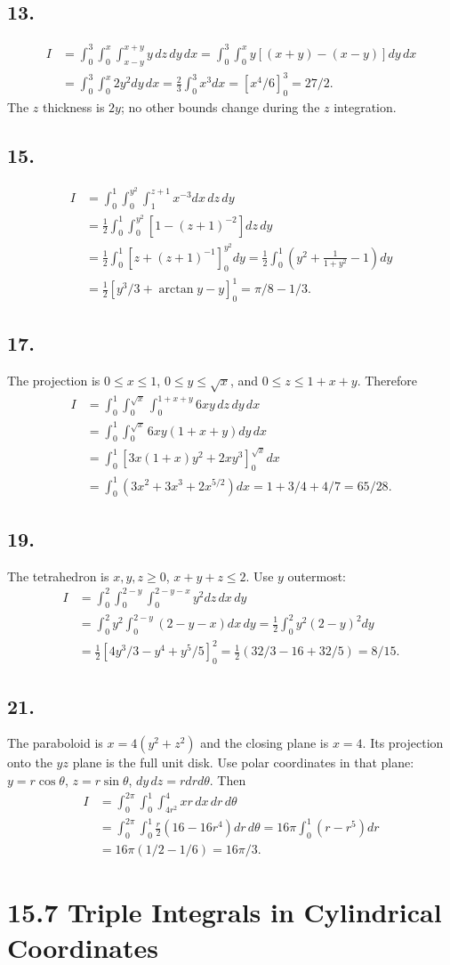 \documentclass[11pt]{article}
\newcommand{\ex}[1]{\subsection*{#1.}}
\newcommand{\ans}[1]{\boxed{#1}}
\begin{document}
\ex{13}
\begin{align*}
I&=\int_0^3\int_0^x\int_{x-y}^{x+y}y\,dz\,dy\,dx
=\int_0^3\int_0^x y[(x+y)-(x-y)]dy\,dx\\
&=\int_0^3\int_0^x2y^2dy\,dx
=\frac23\int_0^3x^3dx=[x^4/6]_0^3=\ans{27/2}.
\end{align*}
The $z$ thickness is $2y$; no other bounds change during the $z$ integration.
\ex{15}
\begin{align*}
I&=\int_0^1\int_0^{y^2}\int_1^{z+1}x^{-3}dx\,dz\,dy\\
&=\frac12\int_0^1\int_0^{y^2}[1-(z+1)^{-2}]dz\,dy\\
&=\frac12\int_0^1[z+(z+1)^{-1}]_0^{y^2}dy
=\frac12\int_0^1\left(y^2+\frac1{1+y^2}-1\right)dy\\
&=\frac12[y^3/3+\arctan y-y]_0^1=\ans{\pi/8-1/3}.
\end{align*}
\ex{17}
The projection is $0\le x\le1$, $0\le y\le\sqrt x$, and $0\le z\le1+x+y$. Therefore
\begin{align*}
I&=\int_0^1\int_0^{\sqrt x}\int_0^{1+x+y}6xy\,dz\,dy\,dx\\
&=\int_0^1\int_0^{\sqrt x}6xy(1+x+y)dy\,dx\\
&=\int_0^1[3x(1+x)y^2+2xy^3]_0^{\sqrt x}dx\\
&=\int_0^1(3x^2+3x^3+2x^{5/2})dx
=1+3/4+4/7=\ans{65/28}.
\end{align*}
\ex{19}
The tetrahedron is $x,y,z\ge0$, $x+y+z\le2$. Use $y$ outermost:
\begin{align*}
I&=\int_0^2\int_0^{2-y}\int_0^{2-y-x}y^2dz\,dx\,dy\\
&=\int_0^2y^2\int_0^{2-y}(2-y-x)dx\,dy
=\frac12\int_0^2y^2(2-y)^2dy\\
&=\frac12[4y^3/3-y^4+y^5/5]_0^2
=\frac12(32/3-16+32/5)=\ans{8/15}.
\end{align*}
\ex{21}
The paraboloid is $x=4(y^2+z^2)$ and the closing plane is $x=4$. Its projection onto the $yz$ plane is the full unit disk. Use polar coordinates in that plane: $y=r\cos\theta$, $z=r\sin\theta$, $dy\,dz=rdrd\theta$. Then
\begin{align*}
I&=\int_0^{2\pi}\int_0^1\int_{4r^2}^4xr\,dx\,dr\,d\theta\\
&=\int_0^{2\pi}\int_0^1\frac r2(16-16r^4)dr\,d\theta
=16\pi\int_0^1(r-r^5)dr\\
&=16\pi(1/2-1/6)=\ans{16\pi/3}.
\end{align*}
\clearpage\section*{15.7 Triple Integrals in Cylindrical Coordinates}
\end{document}
